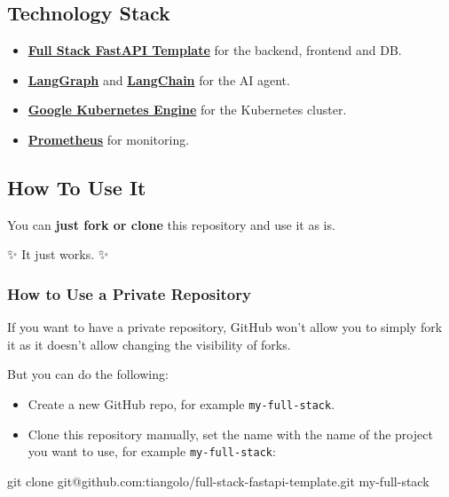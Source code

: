 \documentclass[
]{article}
\newenvironment{Shaded}{}{}
\newcommand{\FunctionTok}[1]{\textcolor[rgb]{0.02,0.16,0.49}{#1}}
\newcommand{\NormalTok}[1]{#1}
\providecommand{\tightlist}{%
  \setlength{\itemsep}{0pt}\setlength{\parskip}{0pt}}
\begin{document}
\hypertarget{technology-stack}{%
\subsection{Technology Stack}\label{technology-stack}}

\begin{itemize}
\tightlist
\item
  \href{https://github.com/tiangolo/full-stack-fastapi-template}{\textbf{Full
  Stack FastAPI Template}} for the backend, frontend and DB.
\item
  \href{https://langchain-ai.github.io/langgraph/}{\textbf{LangGraph}}
  and \href{https://www.langchain.com/}{\textbf{LangChain}} for the AI
  agent.
\item
  \href{https://cloud.google.com/kubernetes-engine}{\textbf{Google
  Kubernetes Engine}} for the Kubernetes cluster.
\item
  \href{https://prometheus.io/}{\textbf{Prometheus}} for monitoring.
\end{itemize}

\hypertarget{how-to-use-it}{%
\subsection{How To Use It}\label{how-to-use-it}}

You can \textbf{just fork or clone} this repository and use it as is.

✨ It just works. ✨

\hypertarget{how-to-use-a-private-repository}{%
\subsubsection{How to Use a Private
Repository}\label{how-to-use-a-private-repository}}

If you want to have a private repository, GitHub won't allow you to
simply fork it as it doesn't allow changing the visibility of forks.

But you can do the following:

\begin{itemize}
\tightlist
\item
  Create a new GitHub repo, for example \texttt{my-full-stack}.
\item
  Clone this repository manually, set the name with the name of the
  project you want to use, for example \texttt{my-full-stack}:
\end{itemize}

\begin{Shaded}
\begin{Highlighting}[]
\FunctionTok{git}\NormalTok{ clone git@github.com:tiangolo/full{-}stack{-}fastapi{-}template.git my{-}full{-}stack}
\end{Highlighting}
\end{Shaded}
\end{document}
